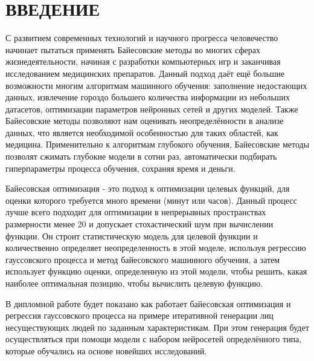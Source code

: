 \chapter*{\large ВВЕДЕНИЕ}  
С развитием современных технологий и научного прогресса человечество начинает пытаться применять Байесовские методы во многих сферах жизнедеятельности, начиная с разработки компьютерных игр и заканчивая исследованием медицинских препаратов. Данный подход даёт ещё большие возможности многим алгоритмам машинного обучения: заполнение недостающих данных, извлечение гороздо большего количества информации из небольших датасетов, оптимизации параметров нейронных сетей и других моделей. Также Байесовские методы позволяют нам оценивать неопределённости в анализе данных, что является необходимой особенностью для таких областей, как медицина. Применительно к алгоритмам глубокого обучения, Байесовские методы позволят сжимать глубокие модели в сотни раз, автоматически подбирать гиперпараметры процесса обучения, сохраняя время и деньги.

Байесовская оптимизация - это подход к оптимизации целевых функций, для оценки которого требуется много времени (минут или часов). Данный процесс лучше всего подходит для оптимизации в непрерывных пространствах размерности менее 20 и допускает стохастический шум при вычислении функции. Он строит статистическую модель для целевой функции и количественно определяет неопределенность в этой моделе, используя регрессию гауссовского процесса и метод байесовского машинного обучения, а затем использует функцию оценки, определенную из этой модели, чтобы решить, какая наиболее оптимальная позицию, чтобы вычислить целевую функцию. 

В дипломной работе будет показано как работает байесовская оптимизация и регрессия гауссовского процесса на примере итеративной генерации лиц несуществующих людей по заданным характеристикам. При этом генерация будет осуществляться при помощи модели с набором нейросетей определённого типа, которые обучались на основе новейших исследований. 